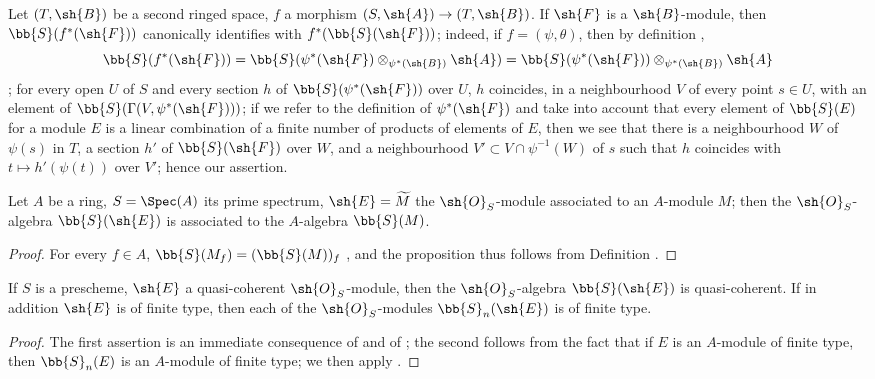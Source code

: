 \begin{env}[1.7.5]
\label{II.1.7.5}
Let $(T,\sh{B})$ be a second ringed space, $f$ a morphism $(S,\sh{A})\to(T,\sh{B})$.
If $\sh{F}$ is a $\sh{B}$-module, then $\bb{S}(f^*(\sh{F}))$ canonically identifies with $f^*(\bb{S}(\sh{F}))$; indeed, if $f=(\psi,\theta)$, then by definition ,
\[
  \bb{S}(f^*(\sh{F}))=\bb{S}(\psi^*(\sh{F})\otimes_{\psi^*(\sh{B})}\sh{A})=\bb{S}(\psi^*(\sh{F}))\otimes_{\psi^*(\sh{B})}\sh{A}
\]
; for every open $U$ of $S$ and every section $h$ of $\bb{S}(\psi^*(\sh{F}))$ over $U$, $h$ coincides, in a neighbourhood $V$ of every point $s\in U$, with an element of $\bb{S}(\Gamma(V,\psi^*(\sh{F})))$; if we refer to the definition of $\psi^*(\sh{F})$  and take into account that every element of $\bb{S}(E)$ for a module $E$ is a linear combination of a finite number of products of elements of $E$, then we see that there is a neighbourhood $W$ of $\psi(s)$ in $T$, a section $h'$ of $\bb{S}(\sh{F})$ over $W$, and a neighbourhood $V'\subset V\cap\psi^{-1}(W)$ of $s$ such that $h$ coincides with $t\mapsto h'(\psi(t))$ over $V'$; hence our assertion.
\end{env}

\begin{proposition}[1.7.6]
\label{II.1.7.6}
Let $A$ be a ring, $S=\Spec(A)$ its prime spectrum, $\sh{E}=\widetilde{M}$ the $\sh{O}_S$-module associated to an $A$-module $M$; then the $\sh{O}_S$-algebra $\bb{S}(\sh{E})$ is associated to the $A$-algebra $\bb{S}(M)$.
\end{proposition}

\begin{proof}
For every $f\in A$, $\bb{S}(M_f)=(\bb{S}(M))_f$ , and the proposition thus follows from Definition .
\end{proof}

\begin{corollary}[1.7.7]
\label{II.1.7.7}
If $S$ is a prescheme, $\sh{E}$ a quasi-coherent $\sh{O}_S$-module, then the $\sh{O}_S$-algebra $\bb{S}(\sh{E})$ is quasi-coherent.
If in addition $\sh{E}$ is of finite type, then each of the $\sh{O}_S$-modules $\bb{S}_n(\sh{E})$ is of finite type.
\end{corollary}

\begin{proof}
The first assertion is an immediate consequence of  and of ; the second follows from the fact that if $E$ is an $A$-module of finite type, then $\bb{S}_n(E)$ is an $A$-module of finite type; we then apply .
\end{proof}

